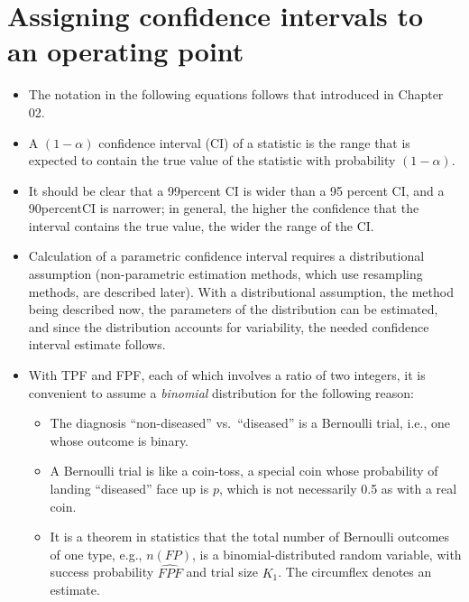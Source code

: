 \documentclass[
]{book}
\providecommand{\tightlist}{%
  \setlength{\itemsep}{0pt}\setlength{\parskip}{0pt}}
\begin{document}
\hypertarget{assigning-confidence-intervals-to-an-operating-point}{%
\section{Assigning confidence intervals to an operating point}\label{assigning-confidence-intervals-to-an-operating-point}}

\begin{itemize}
\tightlist
\item
  The notation in the following equations follows that introduced in Chapter 02.
\item
  A \((1-\alpha)\) confidence interval (CI) of a statistic is the range that is expected to contain the true value of the statistic with probability \((1-\alpha)\).
\item
  It should be clear that a 99percent CI is wider than a 95 percent CI, and a 90percentCI is narrower; in general, the higher the confidence that the interval contains the true value, the wider the range of the CI.
\item
  Calculation of a parametric confidence interval requires a distributional assumption (non-parametric estimation methods, which use resampling methods, are described later). With a distributional assumption, the method being described now, the parameters of the distribution can be estimated, and since the distribution accounts for variability, the needed confidence interval estimate follows.
\item
  With TPF and FPF, each of which involves a ratio of two integers, it is convenient to assume a \emph{binomial} distribution for the following reason:

  \begin{itemize}
  \tightlist
  \item
    The diagnosis ``non-diseased'' vs.~``diseased'' is a Bernoulli trial, i.e., one whose outcome is binary.
  \item
    A Bernoulli trial is like a coin-toss, a special coin whose probability of landing ``diseased'' face up is \(p\), which is not necessarily 0.5 as with a real coin.
  \item
    It is a theorem in statistics that the total number of Bernoulli outcomes of one type, e.g., \(n(FP)\), is a binomial-distributed random variable, with success probability \(\widehat{FPF}\) and trial size \(K_1\). The circumflex denotes an estimate.
  \end{itemize}
\end{itemize}
\end{document}
